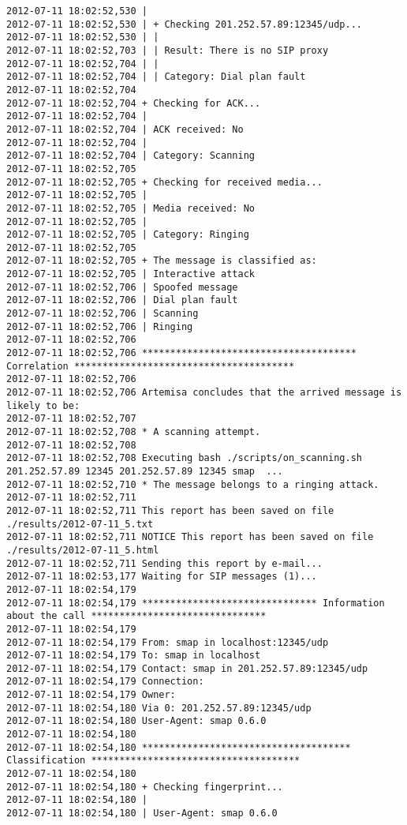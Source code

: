 \documentclass[a4paper,12pt]{report}
\newenvironment{mytinylisting}
{\begin{list}{}{\setlength{\leftmargin}{1em}}\item\tiny\bfseries}
{\end{list}}
\begin{document}
\begin{mytinylisting}
\begin{verbatim}
2012-07-11 18:02:52,530 |
2012-07-11 18:02:52,530 | + Checking 201.252.57.89:12345/udp...
2012-07-11 18:02:52,530 | |
2012-07-11 18:02:52,703 | | Result: There is no SIP proxy
2012-07-11 18:02:52,704 | |
2012-07-11 18:02:52,704 | | Category: Dial plan fault
2012-07-11 18:02:52,704 
2012-07-11 18:02:52,704 + Checking for ACK...
2012-07-11 18:02:52,704 |
2012-07-11 18:02:52,704 | ACK received: No
2012-07-11 18:02:52,704 |
2012-07-11 18:02:52,704 | Category: Scanning
2012-07-11 18:02:52,705 
2012-07-11 18:02:52,705 + Checking for received media...
2012-07-11 18:02:52,705 |
2012-07-11 18:02:52,705 | Media received: No
2012-07-11 18:02:52,705 |
2012-07-11 18:02:52,705 | Category: Ringing
2012-07-11 18:02:52,705 
2012-07-11 18:02:52,705 + The message is classified as:
2012-07-11 18:02:52,705 | Interactive attack
2012-07-11 18:02:52,706 | Spoofed message
2012-07-11 18:02:52,706 | Dial plan fault
2012-07-11 18:02:52,706 | Scanning
2012-07-11 18:02:52,706 | Ringing
2012-07-11 18:02:52,706 
2012-07-11 18:02:52,706 ************************************** Correlation ***************************************
2012-07-11 18:02:52,706 
2012-07-11 18:02:52,706 Artemisa concludes that the arrived message is likely to be:
2012-07-11 18:02:52,707 
2012-07-11 18:02:52,708 * A scanning attempt.
2012-07-11 18:02:52,708 
2012-07-11 18:02:52,708 Executing bash ./scripts/on_scanning.sh 201.252.57.89 12345 201.252.57.89 12345 smap  ...
2012-07-11 18:02:52,710 * The message belongs to a ringing attack.
2012-07-11 18:02:52,711 
2012-07-11 18:02:52,711 This report has been saved on file ./results/2012-07-11_5.txt
2012-07-11 18:02:52,711 NOTICE This report has been saved on file ./results/2012-07-11_5.html
2012-07-11 18:02:52,711 Sending this report by e-mail...
2012-07-11 18:02:53,177 Waiting for SIP messages (1)...
2012-07-11 18:02:54,179 
2012-07-11 18:02:54,179 ******************************* Information about the call *******************************
2012-07-11 18:02:54,179 
2012-07-11 18:02:54,179 From: smap in localhost:12345/udp
2012-07-11 18:02:54,179 To: smap in localhost
2012-07-11 18:02:54,179 Contact: smap in 201.252.57.89:12345/udp
2012-07-11 18:02:54,179 Connection: 
2012-07-11 18:02:54,179 Owner: 
2012-07-11 18:02:54,180 Via 0: 201.252.57.89:12345/udp
2012-07-11 18:02:54,180 User-Agent: smap 0.6.0
2012-07-11 18:02:54,180 
2012-07-11 18:02:54,180 ************************************* Classification *************************************
2012-07-11 18:02:54,180 
2012-07-11 18:02:54,180 + Checking fingerprint...
2012-07-11 18:02:54,180 |
2012-07-11 18:02:54,180 | User-Agent: smap 0.6.0

\end{verbatim}
\end{mytinylisting}
\end{document}
